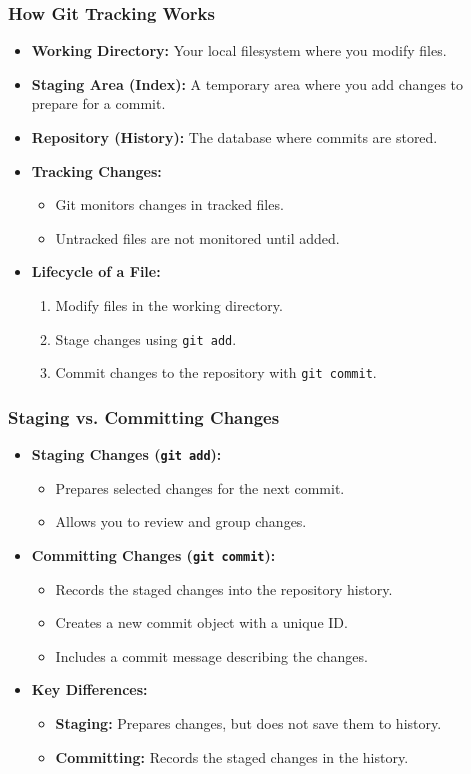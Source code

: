 \begin{frame}
	\frametitle{How Git Tracking Works}
	\begin{itemize}
		\item \textbf{Working Directory:} Your local filesystem where you modify files.
		\item \textbf{Staging Area (Index):} A temporary area where you add changes to prepare for a commit.
		\item \textbf{Repository (History):} The database where commits are stored.
		\item \textbf{Tracking Changes:}
		\begin{itemize}
			\item Git monitors changes in tracked files.
			\item Untracked files are not monitored until added.
		\end{itemize}
		\item \textbf{Lifecycle of a File:}
		\begin{enumerate}
			\item Modify files in the working directory.
			\item Stage changes using \texttt{git add}.
			\item Commit changes to the repository with \texttt{git commit}.
		\end{enumerate}
	\end{itemize}
\end{frame}

\begin{frame}
	\frametitle{Staging vs. Committing Changes}
	\begin{itemize}
		\item \textbf{Staging Changes (\texttt{git add}):}
		\begin{itemize}
			\item Prepares selected changes for the next commit.
			\item Allows you to review and group changes.
		\end{itemize}
		\item \textbf{Committing Changes (\texttt{git commit}):}
		\begin{itemize}
			\item Records the staged changes into the repository history.
			\item Creates a new commit object with a unique ID.
			\item Includes a commit message describing the changes.
		\end{itemize}
		\item \textbf{Key Differences:}
		\begin{itemize}
			\item \textbf{Staging:} Prepares changes, but does not save them to history.
			\item \textbf{Committing:} Records the staged changes in the history.
		\end{itemize}
	\end{itemize}
\end{frame}

